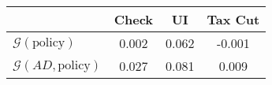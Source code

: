 \begin{tabular}{@{}lccc@{}}
\toprule
                          & Check      & UI    & Tax Cut    \\  \midrule
$\mathcal{G}(\text{policy})$ & 0.002  & 0.062  & -0.001     \\
$\mathcal{G}(AD,\text{policy})$ & 0.027  & 0.081  & 0.009     \\
\end{tabular}
